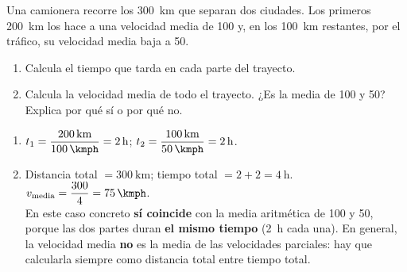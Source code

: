 \begin{exercise}
    Una camionera recorre los \qty{300}{\km} que separan dos ciudades. Los primeros \qty{200}{\km} los hace a una velocidad media de \qty{100}{\kmph} y, en los \qty{100}{\km} restantes, por el tráfico, su velocidad media baja a \qty{50}{\kmph}.
    \begin{enumerate}[label=\letraminuscula]
        \item Calcula el tiempo que tarda en cada parte del trayecto.
        \item Calcula la velocidad media de todo el trayecto. ¿Es la media de \qty{100}{\kmph} y \qty{50}{\kmph}? Explica por qué sí o por qué no.
    \end{enumerate}
    \begin{solu}
        \begin{enumerate}[label=\alph*)]
            \item \(t_1 = \dfrac{\qty{200}{\km}}{\qty{100}{\kmph}} = \qty{2}{\hour}\); \quad \(t_2 = \dfrac{\qty{100}{\km}}{\qty{50}{\kmph}} = \qty{2}{\hour}\).
            \item Distancia total \(= \qty{300}{\km}\); tiempo total \(= 2 + 2 = \qty{4}{\hour}\). \\
            \(v_{\text{media}} = \dfrac{300}{4} = \qty{75}{\kmph}\). \\
            En este caso concreto \textbf{sí coincide} con la media aritmética de \qty{100}{\kmph} y \qty{50}{\kmph}, porque las dos partes duran \textbf{el mismo tiempo} (\qty{2}{\hour} cada una). En general, la velocidad media \textbf{no} es la media de las velocidades parciales: hay que calcularla siempre como distancia total entre tiempo total.
        \end{enumerate}
    \end{solu}
\end{exercise}

